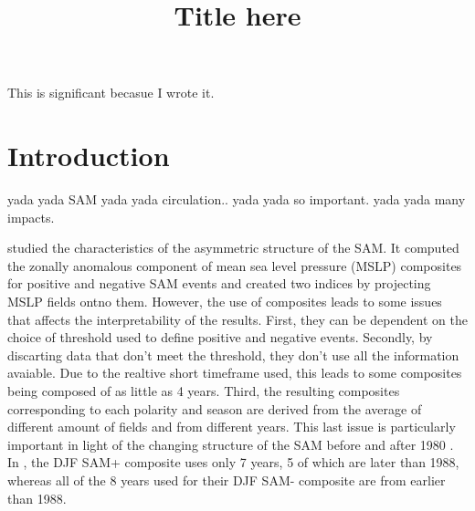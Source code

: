 \documentclass[]{ametsocV5}
\title{Title here}
\affiliation{CIMA UBA blablabla}
\begin{document}
\maketitle


%
%
\statement
This is significant becasue I wrote it.



%

\section{Introduction}

yada yada SAM yada yada circulation.. yada yada so important. yada yada
many impacts.

\citet{fogt2012} studied the characteristics of the asymmetric structure
of the SAM. It computed the zonally anomalous component of mean sea
level pressure (MSLP) composites for positive and negative SAM events
and created two indices by projecting MSLP fields ontno them. However,
the use of composites leads to some issues that affects the
interpretability of the results. First, they can be dependent on the
choice of threshold used to define positive and negative events.
Secondly, by discarting data that don't meet the threshold, they don't
use all the information avaiable. Due to the realtive short timeframe
used, this leads to some composites being composed of as little as 4
years. Third, the resulting composites corresponding to each polarity
and season are derived from the average of different amount of fields
and from different years. This last issue is particularly important in
light of the changing structure of the SAM before and after 1980
\citep{silvestri2009}. In \citet{fogt2012}, the DJF SAM+ composite uses
only 7 years, 5 of which are later than 1988, whereas all of the 8 years
used for their DJF SAM- composite are from earlier than 1988.
\end{document}
